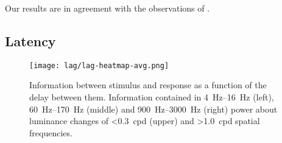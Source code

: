 Our results are in agreement with the observations of \citet[Figure 5B]{Maier2010}.

\subsection{Latency}

%
%
%
%
%

\begin{figure}[htb]
    \centering
    \texttt{[image: lag/lag-heatmap-avg.png]}
    \caption{
Information between stimulus and response as a function of the delay between them.
Information contained in \SIrange{4}{16}{Hz} (left), \SIrange{60}{170}{Hz} (middle) and \SIrange{900}{3000}{Hz} (right) power about luminance changes of \SI{<0.3}{cpd} (upper) and \SI{>1.0}{cpd} spatial frequencies.
}
\label{fig:lam_lag_hm}
\end{figure}


\begin{figure}[htb]
    \centering
    \hspace*{\fill}
    \hspace*{\fill}\hspace{.2cm}\hspace*{\fill}
    \hspace*{\fill}
    \caption{
}
\label{fig:lam_lag}
\end{figure}


